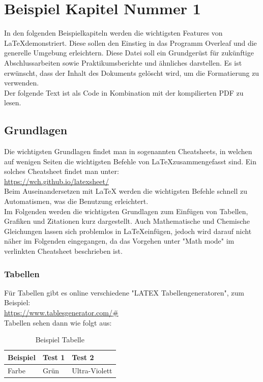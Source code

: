 \section{Beispiel Kapitel Nummer 1}
In den folgenden Beispielkapiteln werden die wichtigsten Features von \LaTeX\:demonstriert. Diese sollen den Einstieg in das Programm Overleaf und die generelle Umgebung erleichtern. Diese Datei soll ein Grundgerüst für zukünftige Abschlussarbeiten sowie Praktikumsberichte und ähnliches darstellen. Es ist erwünscht, dass der Inhalt des Dokuments gelöscht wird, um die Formatierung zu verwenden.\\
Der folgende Text ist als Code in Kombination mit der kompilierten PDF zu lesen.\\

\subsection{Grundlagen}
Die wichtigsten Grundlagen findet man in sogenannten Cheatsheets, in welchen auf wenigen Seiten die wichtigsten Befehle von \LaTeX\:zusammengefasst sind. Ein solches Cheatsheet findet man unter:\\ \url{https://wch.github.io/latexsheet/} \\Beim Auseinandersetzen mit \LaTeX\: werden die wichtigsten Befehle schnell zu Automatismen, was die Benutzung erleichtert.\\
Im Folgenden werden die wichtigsten Grundlagen zum Einfügen von Tabellen, Grafiken und Zitationen kurz dargestellt. Auch Mathematische und Chemische Gleichungen lassen sich problemlos in \LaTeX einfügen, jedoch wird darauf nicht näher im Folgenden eingegangen, da das Vorgehen unter "Math mode" im verlinkten Cheatsheet beschrieben ist.

\pagebreak

\subsubsection{Tabellen}
Für Tabellen gibt es online verschiedene "LATEX Tabellengeneratoren", zum Beispiel:\\
\url{https://www.tablesgenerator.com/#}\\
Tabellen sehen dann wie folgt aus:

\begin{table}[H]
\begin{tabular}{|l|l|l|}
\hline
Beispiel & Test 1 & Test 2        \\ \hline
Farbe    & Grün   & Ultra-Violett \\ \hline
\end{tabular}
\caption[Beispiel Tabelle]{Beispiel Tabelle}
	\label{Tabelle 1}
\end{table}

